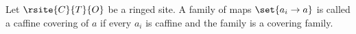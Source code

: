 \begin{definition}
Let $\rsite{C}{T}{O}$ be a ringed site.
A family of maps $\set{a_i \rightarrow a}$
is called a caffine covering of $a$ if every $a_i$ is caffine
and the family is a covering family.
\end{definition}